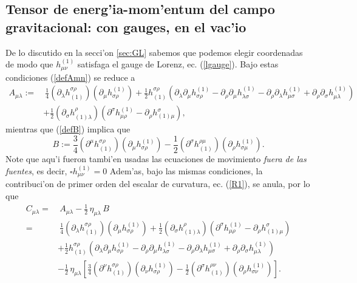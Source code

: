 \subsection{Tensor de energ'ia-mom'entum del campo gravitacional: con gauges, en el vac'io}
De lo discutido en la secci'on \ref{sec:GL} sabemos que podemos elegir coordenadas de modo que $h^{(1)}_{\mu\nu}$ satisfaga el gauge de Lorenz, ec. (\ref{lgauge}). Bajo estas condiciones (\ref{defAmn}) se reduce a
\begin{align}
A_{\mu\lambda} := & \ \frac{1}{4}(\partial_\lambda h^{\sigma\rho}_{(1)})
(\partial_\mu h_{\sigma\rho}^{(1)})+\frac{1}{2}h^{\sigma\rho}_{(1)}
\left(\partial_\lambda\partial_\mu h^{(1)}_{\sigma\rho}-\partial_\rho\partial_\mu
h^{(1)}_{\lambda\sigma}-\partial_\rho\partial_\lambda h^{(1)}_{\mu\sigma}
+ \partial_\rho\partial_\sigma h^{(1)}_{\mu\lambda}\right) \\
& + \frac{1}{2} (\partial_\sigma h^\rho_{(1)\lambda})\left(\partial^\sigma h^{(1)}_{\mu\rho}-\partial_\rho h^\sigma_{(1)\mu}\right),
\end{align}
mientras que (\ref{defB}) implica que
\begin{equation}
B := %
 \frac{3}{4}(\partial^\mu h_{(1)}^{\sigma\rho})(\partial_\mu h^{(1)}_{\sigma\rho}) -\frac{1}{2}(\partial^\sigma h_{(1)}^{\rho\mu})(\partial_\rho h^{(1)}_{\sigma\mu}) .
\end{equation}
Note que aqu'i fueron tambi'en usadas las ecuaciones de movimiento \textit{fuera de las fuentes}, es decir, $\square h^{(1)}_{\mu\nu}=0$
Adem'as, bajo las mismas condiciones, la contribuci'on de primer orden del escalar de curvatura, ec. (\ref{R1}), se anula, por lo que
\begin{align}
C_{\mu\lambda} =&\  A_{\mu\lambda}-\frac{1}{2}\,\eta_{\mu\lambda}\, B \\
 = & \  \frac{1}{4}(\partial_\lambda h^{\sigma\rho}_{(1)})
(\partial_\mu h_{\sigma\rho}^{(1)}) + \frac{1}{2} (\partial_\sigma h^\rho_{(1)\lambda})\left(\partial^\sigma h^{(1)}_{\mu\rho}-\partial_\rho h^\sigma_{(1)\mu}\right) \nonumber\\
& +\frac{1}{2}h^{\sigma\rho}_{(1)}
\left(\partial_\lambda\partial_\mu h^{(1)}_{\sigma\rho}-\partial_\rho\partial_\mu
h^{(1)}_{\lambda\sigma}-\partial_\rho\partial_\lambda h^{(1)}_{\mu\sigma}
+ \partial_\rho\partial_\sigma h^{(1)}_{\mu\lambda}\right)
\nonumber \\
& -\frac{1}{2}\,\eta_{\mu\lambda}\left[ \frac{3}{4}(\partial^\nu h_{(1)}^{\sigma\rho})(\partial_\nu h^{(1)}_{\sigma\rho})
-\frac{1}{2}(\partial^\sigma h_{(1)}^{\rho\nu})(\partial_\rho h^{(1)}_{\sigma\nu})\right] .
\end{align}

